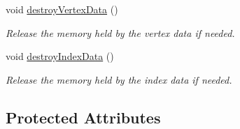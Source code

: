 \begin{DoxyCompactItemize}
void \hyperlink{class_graphics_1_1_triangle_mesh_ae6adf4bba9758b7f103036787290fdf0}{destroyVertexData} ()
\begin{DoxyCompactList}\small\item\em Release the memory held by the vertex data if needed. \end{DoxyCompactList}\item 
void \hyperlink{class_graphics_1_1_triangle_mesh_a9591dd372ed4052ac65f3c5ced71ffd2}{destroyIndexData} ()
\begin{DoxyCompactList}\small\item\em Release the memory held by the index data if needed. \end{DoxyCompactList}\end{DoxyCompactItemize}
\subsection*{Protected Attributes}
